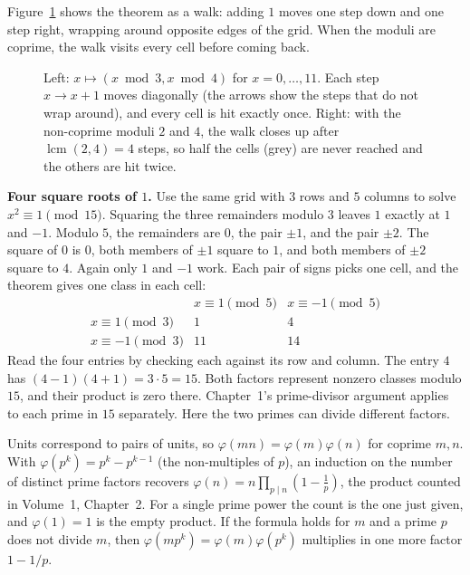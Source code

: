 Figure~\ref{fig:crt} shows the theorem as a walk: adding $1$ moves one step down and one step right, wrapping around opposite edges of the grid. When the moduli are coprime, the walk visits every cell before coming back.

\begin{figure}[ht]
\centering
{}
\caption{Left: $x\mapsto(x\bmod3,x\bmod4)$ for $x=0,\dots,11$. Each step $x\to x+1$ moves diagonally (the arrows show the steps that do not wrap around), and every cell is hit exactly once. Right: with the non-coprime moduli $2$ and $4$, the walk closes up after $\operatorname{lcm}(2,4)=4$ steps, so half the cells (grey) are never reached and the others are hit twice.}
\label{fig:crt}
\end{figure}

\textbf{Four square roots of $1$.} Use the same grid with $3$ rows and $5$ columns to solve $x^2\equiv1\pmod{15}$. Squaring the three remainders modulo $3$ leaves $1$ exactly at $1$ and $-1$. Modulo $5$, the remainders are $0$, the pair $\pm1$, and the pair $\pm2$. The square of $0$ is $0$, both members of $\pm1$ square to $1$, and both members of $\pm2$ square to $4$. Again only $1$ and $-1$ work. Each pair of signs picks one cell, and the theorem gives one class in each cell:
\[
\begin{array}{c|cc}
 &x\equiv1\pmod5&x\equiv-1\pmod5\\ \hline
x\equiv1\pmod3&1&4\\
x\equiv-1\pmod3&11&14
\end{array}
\]
Read the four entries by checking each against its row and column. The entry $4$ has $(4-1)(4+1)=3\cdot5=15$. Both factors represent nonzero classes modulo $15$, and their product is zero there. Chapter~1's prime-divisor argument applies to each prime in $15$ separately. Here the two primes can divide different factors.

Units correspond to pairs of units, so $\varphi(mn)=\varphi(m)\varphi(n)$ for coprime $m,n$. With $\varphi(p^k)=p^k-p^{k-1}$ (the non-multiples of $p$), an induction on the number of distinct prime factors recovers $\varphi(n)=n\prod_{p\mid n}\left(1-\frac1p\right)$, the product counted in Volume~1, Chapter~2. For a single prime power the count is the one just given, and $\varphi(1)=1$ is the empty product. If the formula holds for $m$ and a prime $p$ does not divide $m$, then $\varphi(mp^k)=\varphi(m)\varphi(p^k)$ multiplies in one more factor $1-1/p$.

